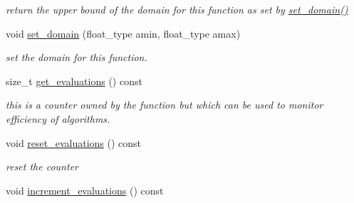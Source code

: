 \begin{DoxyCompactItemize}
\begin{DoxyCompactList}\small\item\em return the upper bound of the domain for this function as set by \hyperlink{classc2__function_adeb70da9c75011e9abd71142dca4c22e}{set\-\_\-domain()} \end{DoxyCompactList}\item 
\hypertarget{classc2__function_adeb70da9c75011e9abd71142dca4c22e}{void \hyperlink{classc2__function_adeb70da9c75011e9abd71142dca4c22e}{set\-\_\-domain} (float\-\_\-type amin, float\-\_\-type amax)}\label{classc2__function_adeb70da9c75011e9abd71142dca4c22e}

\begin{DoxyCompactList}\small\item\em set the domain for this function. \end{DoxyCompactList}\item 
size\-\_\-t \hyperlink{classc2__function_ab6ff0c597019dfb38b1d3d76bfd71e6c}{get\-\_\-evaluations} () const 
\begin{DoxyCompactList}\small\item\em this is a counter owned by the function but which can be used to monitor efficiency of algorithms. \end{DoxyCompactList}\item 
\hypertarget{classc2__function_a8003c40247b7255de5ffbcd3ec21e395}{void \hyperlink{classc2__function_a8003c40247b7255de5ffbcd3ec21e395}{reset\-\_\-evaluations} () const }\label{classc2__function_a8003c40247b7255de5ffbcd3ec21e395}

\begin{DoxyCompactList}\small\item\em reset the counter \end{DoxyCompactList}\item 
\hypertarget{classc2__function_a43555fd6a4ce48f5739e16483170c096}{void \hyperlink{classc2__function_a43555fd6a4ce48f5739e16483170c096}{increment\-\_\-evaluations} () const }\label{classc2__function_a43555fd6a4ce48f5739e16483170c096}


\end{DoxyCompactItemize}
